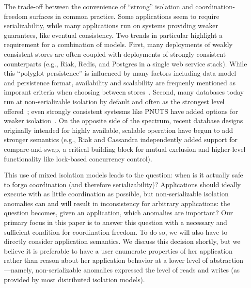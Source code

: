 
 The trade-off between
the convenience of ``strong'' isolation and coordination-freedom
surfaces in common practice. Some applications seem to require
serializability, while many applications run on systems providing
weaker guarantees, like eventual consistency. Two trends in particular
highlight a requirement for a combination of models. First, many
deployments of weakly consistent stores are often coupled with
deployments of strongly consistent counterparts (e.g., Riak, Redis,
and Postgres in a single web service stack). While this ``polyglot
persistence'' is influenced by many factors including data model and
persistence format, availability and scalability are frequenly
mentioned as imporant criteria when choosing between
stores~\cite{polyglot}. Second, many databases today run at
non-serializable isolation by default and often as the strongest level
offered~\cite{hat-vldb}; even strongly consistent systesms like PNUTS
have added options for weaker isolation~\cite{pnuts-update}. On the
opposite side of the spectrum, recent database designs originally
intended for highly available, scalable operation have begun to add
stronger semantics (e.g., Riak and Cassandra independently added
support for compare-and-swap, a critical building block for mutual
exclusion and higher-level functionality like lock-based concurrency
control).

This use of mixed isolation models leads to the question: when is it
actually safe to forgo coordination (and therefore serializability)?
Applications should ideally execute with as little coordination as
possible, but non-serializable isolation anomalies can and will result
in inconsistency for arbitrary applications: the question becomes,
given an application, which anomalies are important? Our primary focus
in this paper is to answer this question with a necessary and
sufficient condition for coordination-freedom. To do so, we will also
have to directly consider application semantics. We discuss this
decision shortly, but we believe it is preferable to have a user
enumerate properties of her application rather than reason about her
application behavior at a lower level of abstraction---namely,
non-serializable anomalies expressed the level of reads and writes (as
provided by most distributed isolation models).

